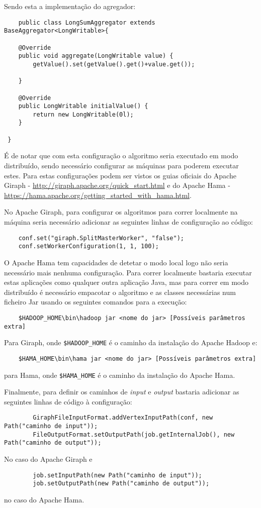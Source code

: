 	Sendo esta a implementação do agregador:
	\begin{verbatim}
	public class LongSumAggregator extends BaseAggregator<LongWritable>{

	@Override
	public void aggregate(LongWritable value) {
		getValue().set(getValue().get()+value.get());
		
	}

	@Override
	public LongWritable initialValue() {
		return new LongWritable(0l);
	}

 }
	\end{verbatim}
	É de notar que com esta configuração o algoritmo seria executado em modo distribuído, sendo necessário configurar as máquinas para poderem executar estes. Para estas configurações podem ser vistos os guias oficiais do Apache Giraph - \url{http://giraph.apache.org/quick_start.html} e do Apache Hama - \url{https://hama.apache.org/getting_started_with_hama.html}.
	
	No Apache Giraph, para configurar os algoritmos para correr localmente na máquina seria necessário adicionar as seguintes linhas de configuração ao código:
	\begin{verbatim}
	conf.set("giraph.SplitMasterWorker", "false");
	conf.setWorkerConfiguration(1, 1, 100);
	\end{verbatim}
	
	O Apache Hama tem capacidades de detetar o modo local logo não seria necessário mais nenhuma configuração.
	\linebreak
	Para correr localmente bastaria executar estas aplicações como qualquer outra aplicação Java, mas para correr em modo distribuído é necessário empacotar o algoritmo e as classes necessárias num ficheiro Jar usando os seguintes comandos para a execução:
	\begin{verbatim}
	$HADOOP_HOME\bin\hadoop jar <nome do jar> [Possíveis parâmetros extra]
	\end{verbatim}
	Para Giraph, onde \verb|$HADOOP_HOME| é o caminho da instalação do Apache Hadoop e: 
	
	\begin{verbatim}
	$HAMA_HOME\bin\hama jar <nome do jar> [Possíveis parâmetros extra]
	\end{verbatim}
	para Hama, onde \verb|$HAMA_HOME| é o caminho da instalação do Apache Hama.
	
	Finalmente, para definir os caminhos de \textit{input} e \textit{output} bastaria adicionar as seguintes linhas de código à configuração:
	\begin{verbatim}
		GiraphFileInputFormat.addVertexInputPath(conf, new Path("caminho de input"));
		FileOutputFormat.setOutputPath(job.getInternalJob(), new Path("caminho de output"));
	\end{verbatim}
	No caso do Apache Giraph e
	\begin{verbatim}
		job.setInputPath(new Path("caminho de input"));
		job.setOutputPath(new Path("caminho de output"));
	\end{verbatim}
	no caso do Apache Hama.
	

